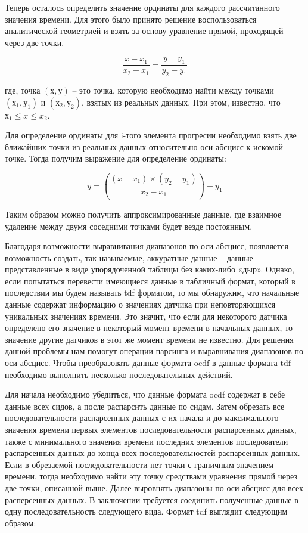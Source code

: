 {  \par \redline Теперь осталось определить значение ординаты для каждого рассчитанного значения времени. Для этого было принято решение воспользоваться аналитической геометрией и взять за основу уравнение прямой, проходящей через две точки.  

  \[\frac{x - x_1}{x_2 - x_1} = \frac{y - y_1}{y_2 - y_1}\]

  где, точка $\left(х, у\right)$ – это точка, которую необходимо найти между точками $\left(х_1, у_1\right)$ и $\left(х_2, у_2\right)$, взятых из реальных данных. При этом, известно, что $х_1 \leq x \leq x_2$. 

  \par \redline Для определение ординаты для i-того элемента прогресии необходимо взять две ближайших точки из реальных данных относительно оси абсцисс к искомой точке. Тогда получим выражение для определение ординаты:

  \[y = \left(\frac{\left(x - x_1\right) \times \left(y_2 - y_1\right)}{x_2 - x_1}\right) + y_1\]

  \par \redline Таким образом можно получить аппроксимированные данные, где взаимное удаление между двумя соседними точками будет везде постоянным.  

  \par \redline Благодаря возможности выравнивания диапазонов по оси абсцисс, появляется возможность создать, так называемые, аккуратные данные – данные представленные в виде упорядоченной таблицы без каких-либо «дыр». Однако, если попытаться перевести имеющиеся данные в табличный формат, который в последствии мы будем называть tdf форматом, то мы обнаружим, что начальные данные содержат информацию о значениях датчика при неповторяющихся уникальных значениях времени. Это значит, что если для некоторого датчика определено его значение в некоторый момент времени в начальных данных, то значение другие датчиков в этот же момент времени не известно. Для решения данной проблемы нам помогут операции парсинга и выравнивания диапазонов по оси абсцисс. Чтобы преобразовать данные формата ocdf в данные формата tdf необходимо выполнить несколько последовательных действий. 

  \par \redline Для начала необходимо убедиться, что данные формата ocdf содержат в себе данные всех сидов, а после распарсить данные по сидам. Затем обрезать все последовательности распарсенных данных с их начала и до максимального значения времени первых элементов последовательности распарсенных данных, также с минимального значения времени последних элементов последователи распарсенных данных до конца всех последовательностей распарсенных данных. Если в обрезаемой последовательности нет точки с граничным значением времени, тогда необходимо найти эту точку средствами уравнения прямой через две точки, описанной выше. Далее выровнять диапазоны по оси абсцисс для всех расперсенных данных. В заключении требуется соединить полученные данные в одну последовательность следующего вида. Формат tdf выглядит следующим образом:

}
